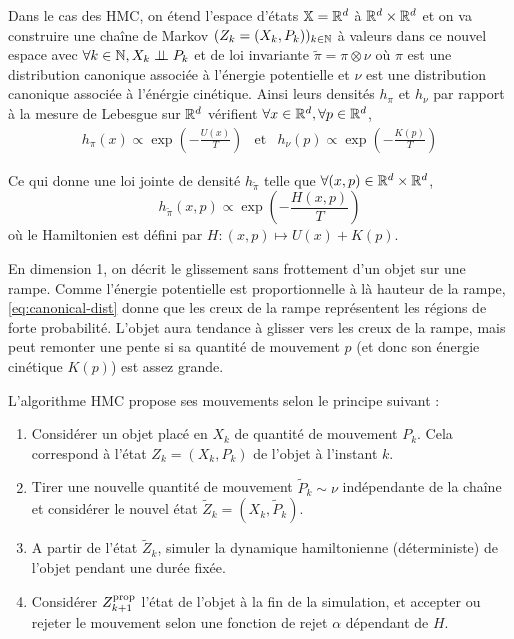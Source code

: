 \documentclass[10pt,a4paper]{article}
\begin{document}
Dans le cas des HMC, on étend l'espace d'états $\mathbb{X} = \mathbb{R}^d$ à $\mathbb{R}^d \times \mathbb{R}^d$ et on va construire une chaîne de Markov $(Z_k = (X_k, P_k))_{k \in \mathbb{N}}$ à valeurs dans ce nouvel espace avec $\forall k \in \mathbb{N}, X_k \perp\!\!\!\perp P_k$ et de loi invariante $\widetilde{\pi} = \pi \otimes \nu$ où $\pi$ est une distribution canonique associée à l'énergie potentielle et $\nu$ est une distribution canonique associée à l'énérgie cinétique. Ainsi leurs densités $h_\pi$ et $h_\nu$ par rapport à la mesure de Lebesgue sur $\mathbb{R}^d$ vérifient $\forall x \in \mathbb{R}^d, \forall p \in \mathbb{R}^d$,
\begin{eqnarray*}
	h_\pi(x) \propto  \exp \left( -\frac{U(x)}{T} \right) & \text{et} &
	h_\nu(p) \propto  \exp \left( -\frac{K(p)}{T} \right)
\end{eqnarray*}

Ce qui donne une loi jointe de densité $h_{\widetilde{\pi}}$ telle que $\forall (x,p) \in \mathbb{R}^d \times \mathbb{R}^d$, 
\begin{equation} \label{eq:canonical-dist}
	h_{\widetilde{\pi}}(x,p) \propto \exp \left( -\frac{H(x,p)}{T} \right)
\end{equation}
où le Hamiltonien est défini par $H : (x,p) \mapsto U(x) + K(p)$.

\begin{Rque}
	En dimension 1, on décrit le glissement sans frottement d'un objet sur une rampe. Comme l'énergie potentielle est proportionnelle à là hauteur de la rampe, \eqref{eq:canonical-dist} donne que les creux de la rampe représentent les régions de forte probabilité. L'objet aura tendance à glisser vers les creux de la rampe, mais peut remonter une pente si sa quantité de mouvement $p$ (et donc son énergie cinétique $K(p)$) est assez grande.
\end{Rque}

L'algorithme HMC propose ses mouvements selon le principe suivant : 
\begin{enumerate}
	\item Considérer un objet placé en $X_k$ de quantité de mouvement $P_k$. Cela correspond à l'état $Z_k = (X_k, P_k)$ de l'objet à l'instant $k$.
	\item Tirer une nouvelle quantité de mouvement $\tilde{P}_k \sim \nu$ indépendante de la chaîne et considérer le nouvel état $\tilde{Z}_k = (X_k, \tilde{P}_k)$. 
	\item A partir de l'état $\tilde{Z}_k$, simuler la dynamique hamiltonienne (déterministe) de l'objet pendant une durée fixée.
	\item Considérer $Z_{k+1}^{\rm prop}$ l'état de l'objet à la fin de la simulation, et accepter ou rejeter le mouvement selon une fonction de rejet $\alpha$ dépendant de $H$. 
\end{enumerate}
\end{document}
